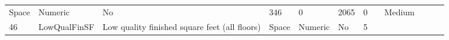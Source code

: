 \documentclass[11pt]{article}
\begin{document}
\begin{longtable}[]{@{}llllllllllll@{}}
\begin{minipage}[t]{0.04\columnwidth}
Space\strut
\end{minipage} & \begin{minipage}[t]{0.04\columnwidth}\raggedright\strut
Numeric\strut
\end{minipage} & \begin{minipage}[t]{0.04\columnwidth}\raggedright\strut
No\strut
\end{minipage} & \begin{minipage}[t]{0.04\columnwidth}\raggedright\strut
346\strut
\end{minipage} & \begin{minipage}[t]{0.04\columnwidth}\raggedright\strut
0\strut
\end{minipage} & \begin{minipage}[t]{0.04\columnwidth}\raggedright\strut
2065\strut
\end{minipage} & \begin{minipage}[t]{0.04\columnwidth}\raggedright\strut
0\strut
\end{minipage} & \begin{minipage}[t]{0.04\columnwidth}\raggedright\strut
\strut
\end{minipage} & \begin{minipage}[t]{0.04\columnwidth}\raggedright\strut
Medium\strut
\end{minipage}\tabularnewline
\begin{minipage}[t]{0.04\columnwidth}\raggedright\strut
46\strut
\end{minipage} & \begin{minipage}[t]{0.04\columnwidth}\raggedright\strut
LowQualFinSF\strut
\end{minipage} & \begin{minipage}[t]{0.04\columnwidth}\raggedright\strut
Low quality finished square feet (all floors)\strut
\end{minipage} & \begin{minipage}[t]{0.04\columnwidth}\raggedright\strut
Space\strut
\end{minipage} & \begin{minipage}[t]{0.04\columnwidth}\raggedright\strut
Numeric\strut
\end{minipage} & \begin{minipage}[t]{0.04\columnwidth}\raggedright\strut
No\strut
\end{minipage} & \begin{minipage}[t]{0.04\columnwidth}\raggedright\strut
5\strut
\end{minipage} & \begin{minipage}[t]{0.04\columnwidth}\raggedright\strut

\end{minipage}
\end{longtable}
\end{document}
